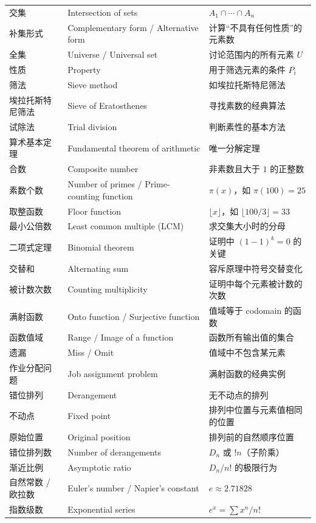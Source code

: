 \documentclass[UTF8,11pt,a4paper]{ctexbook}   %
\theoremstyle{definition}
\begin{document}
\begin{longtable}{|p{4.8cm}|p{4.8cm}|p{4.8cm}|}
交集 & Intersection of sets & $A_1\cap\cdots\cap A_n$ \\
补集形式 & Complementary form / Alternative form & 计算``不具有任何性质''的元素数 \\
全集 & Universe / Universal set & 讨论范围内的所有元素 $U$ \\
性质 & Property & 用于筛选元素的条件 $P_i$ \\
筛法 & Sieve method & 如埃拉托斯特尼筛法 \\
埃拉托斯特尼筛法 & Sieve of Eratosthenes & 寻找素数的经典算法 \\
试除法 & Trial division & 判断素性的基本方法 \\
算术基本定理 & Fundamental theorem of arithmetic & 唯一分解定理 \\
合数 & Composite number & 非素数且大于 $1$ 的正整数 \\
素数个数 & Number of primes / Prime-counting function & $\pi(x)$，如 $\pi(100)=25$ \\
取整函数 & Floor function & $\lfloor x\rfloor$，如 $\lfloor 100/3\rfloor=33$ \\
最小公倍数 & Least common multiple (LCM) & 求交集大小时的分母 \\
二项式定理 & Binomial theorem & 证明中 $(1-1)^k=0$ 的关键 \\
交替和 & Alternating sum & 容斥原理中符号交替变化 \\
被计数次数 & Counting multiplicity & 证明中每个元素被计数的次数 \\
\hline
满射函数 & Onto function / Surjective function & 值域等于 codomain 的函数 \\
函数值域 & Range / Image of a function & 函数所有输出值的集合 \\
遗漏 & Miss / Omit & 值域中不包含某元素 \\
作业分配问题 & Job assignment problem & 满射函数的经典实例 \\
错位排列 & Derangement & 无不动点的排列 \\
不动点 & Fixed point & 排列中位置与元素值相同的位置 \\
原始位置 & Original position & 排列前的自然顺序位置 \\
错位排列数 & Number of derangements & $D_n$ 或 $!n$（子阶乘） \\
渐近比例 & Asymptotic ratio & $D_n/n!$ 的极限行为 \\
自然常数 / 欧拉数 & Euler's number / Napier's constant & $e\approx 2.71828$ \\
指数级数 & Exponential series & $e^x=\sum x^n/n!$ \\

\end{longtable}
\end{document}
